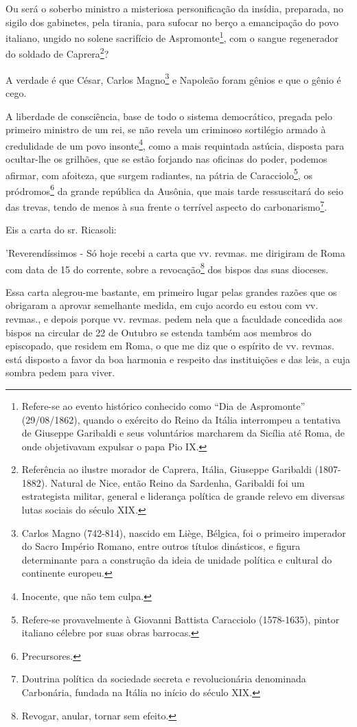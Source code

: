 Ou será o soberbo ministro a misteriosa personificação da insídia,
preparada, no sigilo dos gabinetes, pela tirania, para sufocar no berço
a emancipação do povo italiano, ungido no solene sacrifício de
Aspromonte\footnote{Refere-se ao evento histórico conhecido como ``Dia
  de Aspromonte'' (29/08/1862), quando o exército do Reino da Itália
  interrompeu a tentativa de Giuseppe Garibaldi e seus voluntários
  marcharem da Sicília até Roma, de onde objetivavam expulsar o papa Pio
  IX.}, com o sangue regenerador do soldado de Caprera\footnote{
  Referência ao ilustre morador de Caprera, Itália, Giuseppe Garibaldi
  (1807-1882). Natural de Nice, então Reino da Sardenha, Garibaldi foi
  um estrategista militar, general e liderança política de grande relevo
  em diversas lutas sociais do século XIX.}?

A verdade é que César, Carlos Magno\footnote{Carlos Magno (742-814),
  nascido em Liège, Bélgica, foi o primeiro imperador do Sacro Império
  Romano, entre outros títulos dinásticos, e figura determinante para a
  construção da ideia de unidade política e cultural do continente
  europeu.} e Napoleão foram gênios e que o gênio é cego.

A liberdade de consciência, base de todo o sistema democrático, pregada
pelo primeiro ministro de um rei, se não revela um criminoso sortilégio
armado à credulidade de um povo insonte\footnote{Inocente, que não tem
  culpa.}, como a mais requintada astúcia, disposta para ocultar-lhe os
grilhões, que se estão forjando nas oficinas do poder, podemos afirmar,
com afoiteza, que surgem radiantes, na pátria de Caracciolo\footnote{
  Refere-se provavelmente à Giovanni Battista Caracciolo (1578-1635),
  pintor italiano célebre por suas obras barrocas.}, os
pródromos\footnote{Precursores.} da grande república da Ausônia, que
mais tarde ressuscitará do seio das trevas, tendo de menos à sua frente
o terrível aspecto do carbonarismo\footnote{Doutrina política da
  sociedade secreta e revolucionária denominada Carbonária, fundada na
  Itália no início do século XIX.}.

Eis a carta do sr. Ricasoli:

'Reverendíssimos - Só hoje recebi a carta que vv. revmas. me dirigiram
de Roma com data de 15 do corrente, sobre a revocação\footnote{
  Revogar, anular, tornar sem efeito.} dos bispos das suas dioceses.

Essa carta alegrou-me bastante, em primeiro lugar pelas grandes razões
que os obrigaram a aprovar semelhante medida, em cujo acordo eu estou
com vv. revmas., e depois porque vv. revmas. pedem nela que a faculdade
concedida aos bispos na circular de 22 de Outubro se estenda também aos
membros do episcopado, que residem em Roma, o que me diz que o espírito
de vv. revmas. está disposto a favor da boa harmonia e respeito das
instituições e das leis, a cuja sombra pedem para viver.

